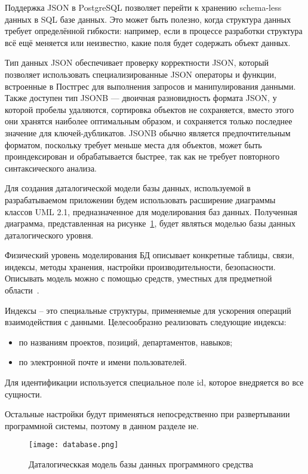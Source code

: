 Поддержка JSON в PostgreSQL позволяет перейти к хранению schema-less данных в SQL базе данных. Это может быть полезно,
когда структура данных требует определённой гибкости: например, если в процессе разработки структура всё ещё меняется
или неизвестно, какие поля будет содержать объект данных.

Тип данных JSON обеспечивает проверку корректности JSON, который позволяет использовать специализированные JSON
операторы и функции, встроенные в Постгрес для выполнения запросов и манипулирования данными. Также доступен тип
JSONB — двоичная разновидность формата JSON, у которой пробелы удаляются, сортировка объектов не сохраняется, вместо
этого они хранятся наиболее оптимальным образом, и сохраняется только последнее значение для ключей-дубликатов.
JSONB обычно является предпочтительным форматом, поскольку требует меньше места для объектов, может быть
проиндексирован и обрабатывается быстрее, так как не требует повторного синтаксического анализа. 

Для создания даталогической модели базы данных, используемой в разрабатываемом приложении будем использовать расширение
диаграммы классов UML 2.1, предназначенное для моделирования баз данных. Полученная диаграмма, представленная на
рисунке~\ref{fig:design:db:model}, будет являться моделью базы данных даталогического уровня.

Физический уровень моделирования БД описывает конкретные таблицы, связи, индексы, методы хранения, настройки
производительности, безопасности. Описывать модель можно с помощью средств, уместных для предметной
области~\cite{kulikov_db_workbook}.

Индексы -- это специальные структуры, применяемые для ускорения операций взаимодействия с данными.
Целесообразно реализовать следующие индексы:

\begin{itemize}
	\item по названиям проектов, позиций, департаментов, навыков;
	\item по электронной почте и имени пользователей.
\end{itemize}

Для идентификации используется специальное поле id, которое внедряется во все сущности.

Остальные настройки будут применяться непосредственно при развертывании программной системы, поэтому в данном разделе
не.

\begin{figure}[!ht]
	\centering
	\texttt{[image: database.png]} 
	\caption{Даталогическкая модель базы данных программного средства}
	\label{fig:design:db:model}
\end{figure}
